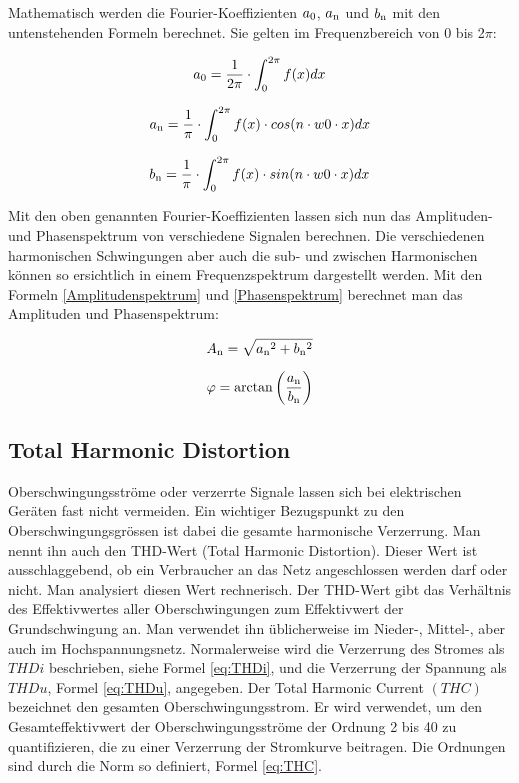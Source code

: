 Mathematisch werden die Fourier-Koeffizienten $a\textsubscript{0}$, $a\textsubscript{n}$ und $b\textsubscript{n}$ mit den untenstehenden Formeln berechnet. Sie gelten im Frequenzbereich von 0 bis 2$\pi$: 

\begin{equation}\label{a0}
a\textsubscript{0} =  {\frac{1}{2\pi} \cdot \int_{0}^{2\pi} f(x) dx}
\end{equation}

\begin{equation}\label{an}
a\textsubscript{n} =  {\frac{1}{\pi} \cdot \int_{0}^{2\pi} f(x) \cdot cos(n \cdot w0 \cdot x) dx}
\end{equation}

\begin{equation}\label{bn}
b\textsubscript{n} =  {\frac{1}{\pi} \cdot \int_{0}^{2\pi} f(x) \cdot sin(n \cdot w0 \cdot x) dx}
\end{equation}

Mit den oben genannten Fourier-Koeffizienten lassen sich nun das Amplituden- und Phasenspektrum von verschiedene Signalen berechnen. Die verschiedenen harmonischen Schwingungen aber auch die sub- und zwischen Harmonischen können so ersichtlich in einem Frequenzspektrum dargestellt werden. Mit den Formeln \ref{Amplitudenspektrum} und \ref{Phasenspektrum} berechnet man das Amplituden und Phasenspektrum:

\begin{equation}\label{Amplitudenspektrum}
A\textsubscript{n} = {\sqrt{a\textsubscript{n}^2+b\textsubscript{n}^2}}
\end{equation}

\begin{equation}\label{Phasenspektrum}
\varphi = \arctan\left( \frac{a\textsubscript{n}}{b\textsubscript{n}}\right) 
\end{equation}



\subsection{Total Harmonic Distortion}
Oberschwingungsströme oder verzerrte Signale lassen sich bei elektrischen Geräten fast nicht vermeiden. Ein wichtiger Bezugspunkt zu den Oberschwingungsgrössen ist dabei die gesamte harmonische Verzerrung. Man nennt ihn auch den THD-Wert (Total Harmonic Distortion). Dieser Wert ist ausschlaggebend, ob ein Verbraucher an das Netz angeschlossen werden darf oder nicht. Man analysiert diesen Wert rechnerisch. Der THD-Wert gibt das Verhältnis des Effektivwertes aller Oberschwingungen zum Effektivwert der Grundschwingung an. Man verwendet ihn üblicherweise im Nieder-, Mittel-, aber auch im Hochspannungsnetz. Normalerweise wird die Verzerrung des Stromes als $THDi$ beschrieben, siehe Formel \ref{eq:THDi}, und die Verzerrung der Spannung als $THDu$, Formel \ref{eq:THDu}, angegeben. Der Total Harmonic Current $(THC)$ bezeichnet den gesamten Oberschwingungsstrom. Er wird verwendet, um den Gesamteffektivwert der Oberschwingungsströme der Ordnung 2 bis 40 zu quantifizieren, die zu einer Verzerrung der Stromkurve beitragen. Die Ordnungen sind durch die Norm so definiert, Formel \ref{eq:THC}. 

